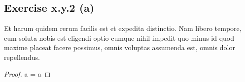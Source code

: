 \documentclass{exam}
\begin{document}
\subsection*{Exercise x.y.2 (a)}
Et harum quidem rerum facilis est et expedita distinctio. Nam libero tempore, cum soluta nobis est 
eligendi optio cumque nihil impedit quo minus id quod maxime placeat facere possimus, omnis voluptas assumenda est, 
omnis dolor repellendus. 
\begin{proof}
     a = a
\end{proof}
\end{document}
